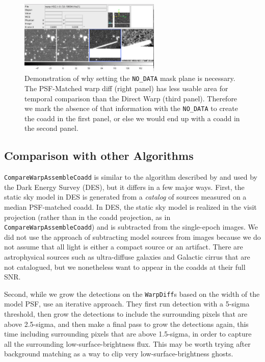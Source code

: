 \documentclass[DM,authoryear,toc]{lsstdoc}
\begin{document}
\begin{figure}
\begin{centering}
\includegraphics[width=0.6\textwidth]{figures/less_data.png}
\par\end{centering}
\caption{\label{fig:nodata}  Demonstration of why setting the \texttt{NO\_DATA} mask plane is necessary. The PSF-Matched warp diff (right panel) has less usable area for temporal comparison than the Direct Warp (third panel). Therefore we mark the absence of that information with the \texttt{NO\_DATA} to create the coadd in the first panel, or else we would end up with a coadd in the second panel.}
\end{figure}

\subsection{Comparison with other Algorithms}

\texttt{CompareWarpAssembleCoadd} is similar to the algorithm described by \citet{2016A&C....16...67D} and used by the Dark Energy Survey (DES), but it differs in a few major ways.
First, the static sky model in DES  is generated from a \emph{catalog} of sources measured on a median PSF-matched coadd.
In DES, the static sky model is realized in the visit projection (rather than in the coadd projection, as in \texttt{CompareWarpAssembleCoadd}) and is subtracted from the single-epoch images.
We did not use the approach of subtracting model sources from images because we do not assume that all light is either a  compact source or an artifact.
There are astrophysical sources such as ultra-diffuse galaxies and Galactic cirrus  that are not catalogued, but we nonetheless want to appear in the coadds at their full SNR.

Second, while we grow the detections on the \texttt{WarpDiff}s  based on  the width of the model PSF, \citet{2016A&C....16...67D} use an iterative approach.
They first run detection with a  5-sigma threshold,  then grow the detections to include the surrounding pixels that are above 2.5-sigma, and then make a final pass to grow the detections again, this time including surrounding pixels that are above 1.5-sigma,
in order to capture all the surrounding low-surface-brightness flux.
This may be worth trying after background matching as a way to clip very low-surface-brightness ghosts.
\end{document}
